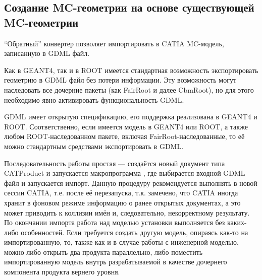\subsection{Создание MC-геометрии на основе существующей MC-геометрии}\label{sec:secMCtoCAD}

``Обратный'' конвертер  позволяет импортировать в CATIA MC-модель, записанную в GDML файл.

Как в GEANT4, так и в ROOT имеется стандартная возможность экспортировать геометрию в GDML файл без потери информации. Эту возможность могут наследовать все дочерние пакеты (как FairRoot и далее CbmRoot), но для этого необходимо явно активировать функциональность GDML. 

GDML имеет открытую спецификацию, его поддержка реализована в GEANT4 и ROOT. Соответственно, если имеется модель в GEANT4 или ROOT, а также любом ROOT-наследованном пакете, включая FairRoot-наследованные, то её можно стандартным средствами экспортировать в GDML.

Последовательность работы простая --- создаётся новый документ типа CATProduct и запускается макропрограмма , где выбирается входной GDML файл и запускается импорт. Данную процедуру рекомендуется выполнять в новой сессии CATIA, т.е. после её перезапуска, т.к. замечено, что CATIA иногда хранит в фоновом режиме информацию о ранее открытых документах, а это может приводить к коллизии имён и, следовательно, некорректному результату. По окончании импорта работа над моделью установки выполняется без каких-либо особенностей. Если требуется создать другую модель, опираясь как-то на импортированную, то, также как и в случае работы с инженерной моделью, можно либо открыть два продукта параллельно, либо поместить импортированную модель внутрь разрабатываемой в качестве дочернего компонента продукта вернего уровня.
